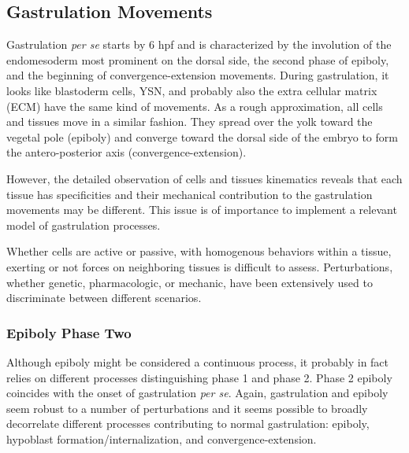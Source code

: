 \subsection{Gastrulation Movements}


Gastrulation \textit{per se} starts by 6 hpf and is characterized by the involution of the endomesoderm most prominent on the dorsal side, the second phase of epiboly, and the beginning of convergence-extension movements. During gastrulation, it looks like blastoderm cells, YSN, and probably also the extra cellular matrix (ECM) have the same kind of movements. As a rough approximation, all cells and tissues move in a similar fashion. They spread over the yolk toward the vegetal pole (epiboly) and converge toward the dorsal side of the embryo to form the antero-posterior axis (convergence-extension).

However, the detailed observation of cells and tissues kinematics reveals that each tissue has specificities and their mechanical contribution to the gastrulation movements may be different. This issue is of importance to implement a relevant model of gastrulation processes.

Whether cells are active or passive, with homogenous behaviors within a tissue, exerting or not forces on neighboring tissues is difficult to assess. Perturbations, whether genetic, pharmacologic, or mechanic, have been extensively used to discriminate between different scenarios.


\subsubsection{Epiboly Phase Two}


Although epiboly might be considered a continuous process, it probably in fact relies on different processes distinguishing phase 1 and phase 2. Phase 2 epiboly coincides with the onset of gastrulation \textit{per se}. Again, gastrulation and epiboly seem robust to a number of perturbations and it seems possible to broadly decorrelate different processes contributing to normal gastrulation: epiboly, hypoblast formation/internalization, and convergence-extension.

